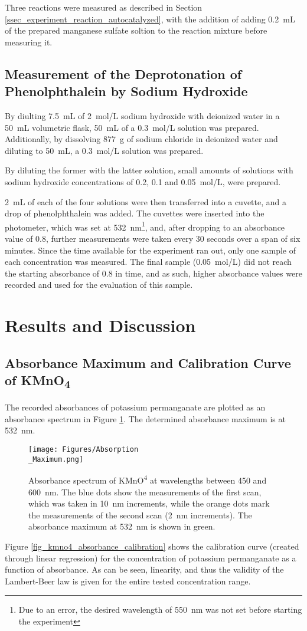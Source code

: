 \documentclass[titlepage]{article}
\begin{document}
Three reactions were measured as described in Section \ref{ssec_experiment_reaction_autocatalyzed}, with the addition of adding 0.2~mL of the prepared manganese sulfate soltion to the reaction mixture before measuring it.

\subsection{Measurement of the Deprotonation of Phenolphthalein by Sodium Hydroxide}
By diulting 7.5~mL of 2~mol/L sodium hydroxide with deionized water in a 50~mL volumetric flask, 50~mL of a 0.3~mol/L solution was prepared. Additionally, by dissolving 877~g of sodium chloride in deionized water and diluting to 50~mL, a 0.3~mol/L solution was prepared.

By diluting the former with the latter solution, small amounts of solutions with sodium hydroxide concentrations of 0.2, 0.1 and 0.05~mol/L, were prepared.

2~mL of each of the four solutions were then transferred into a cuvette, and a drop of phenolphthalein was added. The cuvettes were inserted into the photometer, which was set at 532~nm\footnote{Due to an error, the desired wavelength of 550~nm was not set before starting the experiment}, and, after dropping to an absorbance value of 0.8, further measurements were taken every 30 seconds over a span of six minutes. Since the time available for the experiment ran out, only one sample of each concentration was measured. The final sample (0.05~mol/L) did not reach the starting absorbance of 0.8 in time, and as such, higher absorbance values were recorded and used for the evaluation of this sample.

\newpage
\section{Results and Discussion}
\subsection{Absorbance Maximum and Calibration Curve of KMnO\texorpdfstring{\textsubscript{4}}{4}}
The recorded absorbances of potassium permanganate are plotted as an absorbance spectrum in Figure \ref{fig_kmno4_absorbance_spectrum}. The determined absorbance maximum is at 532~nm.
%
\begin{figure}[H]
    \centering
    \texttt{[image: Figures/Absorption\\\_Maximum.png]}
    \caption{Absorbance spectrum of KMnO\textsuperscript{4} at wavelengths between 450 and 600~nm. The blue dots show the measurements of the first scan, which was taken in 10~nm increments, while the orange dots mark the measurements of the second scan (2~nm increments). The absorbance maximum at 532~nm is shown in green.}
    \label{fig_kmno4_absorbance_spectrum}
\end{figure}
%
\noindent Figure \ref{fig_kmno4_absorbance_calibration} shows the calibration curve (created through linear regression) for the concentration of potassium permanganate as a function of absorbance. As can be seen, linearity, and thus the validity of the Lambert-Beer law is given for the entire tested concentration range.
\end{document}
